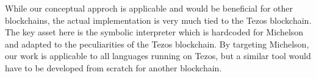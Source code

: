 \documentclass[a4paper,USenglish,american,cleveref, autoref, thm-restate]{oasics-v2021}
\begin{document}
While our conceptual approch is applicable and would be beneficial for other blockchains, the actual
implementation is very much tied to the Tezos blockchain. The key asset here is the symbolic
interpreter which is hardcoded for Michelson and adapted to the peculiarities of the Tezos
blockchain. By targeting Michelson, our work is applicable to all languages running on Tezos, but
a similar tool would have to be developed from scratch for another blockchain.




\end{document}
